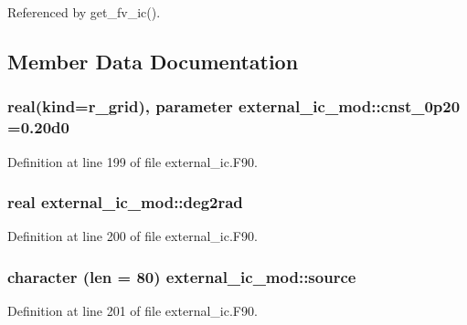 Referenced by get\-\_\-fv\-\_\-ic().



\subsection{Member Data Documentation}
\subsubsection[{cnst\-\_\-0p20}]{\setlength{\rightskip}{0pt plus 5cm}real(kind=r\-\_\-grid), parameter external\-\_\-ic\-\_\-mod\-::cnst\-\_\-0p20 =0.\-20d0\hspace{0.3cm}{\ttfamily [private]}}\label{classexternal__ic__mod_a5405c33818b4654e81d65a4d167bf30d}


Definition at line 199 of file external\-\_\-ic.\-F90.

\subsubsection[{deg2rad}]{\setlength{\rightskip}{0pt plus 5cm}real external\-\_\-ic\-\_\-mod\-::deg2rad\hspace{0.3cm}{\ttfamily [private]}}\label{classexternal__ic__mod_afabc509912a4ec0c963a4b262a69fae8}


Definition at line 200 of file external\-\_\-ic.\-F90.

\subsubsection[{source}]{\setlength{\rightskip}{0pt plus 5cm}character (len = 80) external\-\_\-ic\-\_\-mod\-::source\hspace{0.3cm}{\ttfamily [private]}}\label{classexternal__ic__mod_a74aa0c5ee3e124f0d7a6a4688b045c6e}


Definition at line 201 of file external\-\_\-ic.\-F90.


